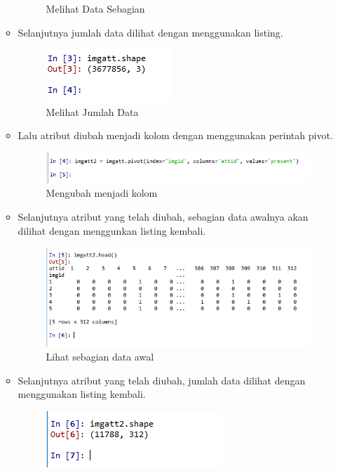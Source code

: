 \begin{enumerate}
\begin{itemize}
\begin{figure}[!hbtp]
			\caption{Melihat Data Sebagian}
			\label{contoh}
			\end{figure}
		\item Selanjutnya jumlah data dilihat dengan menggunakan listing.
			\begin{figure}[!hbtp]
			\centering
			\includegraphics[scale=0.5]{figures/AIP/ai9.PNG}
			\caption{Melihat Jumlah Data}
			\label{contoh}
			\end{figure}
		\item Lalu atribut diubah menjadi kolom dengan menggunakan perintah pivot.
			\begin{figure}[!hbtp]
			\centering
			\includegraphics[scale=0.5]{figures/AIP/ai10.PNG}
			\caption{Mengubah menjadi kolom}
			\label{contoh}
			\end{figure}
		\item Selanjutnya atribut yang telah diubah, sebagian data awalnya akan dilihat dengan menggunkan listing kembali.
			\begin{figure}[!hbtp]
			\centering
			\includegraphics[scale=0.5]{figures/AIP/ai11.PNG}
			\caption{Lihat sebagian data awal}
			\label{contoh}
			\end{figure}
		\item Selanjutnya atribut yang telah diubah, jumlah data dilihat dengan menggunakan listing kembali.
			\begin{figure}[!hbtp]
			\centering
			\includegraphics[scale=0.5]{figures/AIP/ai12.PNG}

\end{figure}
\end{itemize}
\end{enumerate}
